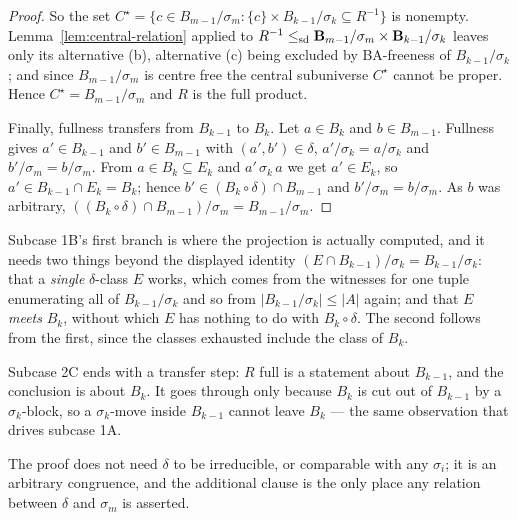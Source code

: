 \begin{proof}
So the set $C^{\star}=\{c\in B_{m-1}/\sigma_{m}:\{c\}\times B_{k-1}/\sigma_{k}
\subseteq R^{-1}\}$ is nonempty. Lemma~\ref{lem:central-relation} applied to
$R^{-1}\le_{\mathrm{sd}}\mathbf B_{m-1}/\sigma_{m}\times\mathbf B_{k-1}/\sigma_{k}$ leaves
only its alternative (b), alternative (c) being excluded by BA-freeness of
$B_{k-1}/\sigma_{k}$; and since $B_{m-1}/\sigma_{m}$ is centre free the central
subuniverse $C^{\star}$ cannot be proper. Hence
$C^{\star}=B_{m-1}/\sigma_{m}$ and $R$ is the full product.

Finally, fullness transfers from $B_{k-1}$ to $B_{k}$. Let $a\in B_{k}$ and
$b\in B_{m-1}$. Fullness gives $a'\in B_{k-1}$ and $b'\in B_{m-1}$ with
$(a',b')\in\delta$, $a'/\sigma_{k}=a/\sigma_{k}$ and
$b'/\sigma_{m}=b/\sigma_{m}$. From $a\in B_{k}\subseteq E_{k}$ and
$a'\,\sigma_{k}\,a$ we get $a'\in E_{k}$, so $a'\in B_{k-1}\cap E_{k}=B_{k}$;
hence $b'\in(B_{k}\circ\delta)\cap B_{m-1}$ and $b'/\sigma_{m}=b/\sigma_{m}$.
As $b$ was arbitrary, $((B_{k}\circ\delta)\cap B_{m-1})/\sigma_{m}=
B_{m-1}/\sigma_{m}$.
\end{proof}

\begin{hazard}\label{haz:self-intersection}
Subcase 1B's first branch is where the projection is actually computed, and it
needs two things beyond the displayed identity
$(E\cap B_{k-1})/\sigma_{k}=B_{k-1}/\sigma_{k}$: that a \emph{single}
$\delta$-class $E$ works, which comes from the witnesses for one tuple
enumerating all of $B_{k-1}/\sigma_{k}$ and so from $|B_{k-1}/\sigma_{k}|\le
|A|$ again; and that $E$ \emph{meets} $B_{k}$, without which $E$ has nothing to
do with $B_{k}\circ\delta$. The second follows from the first, since the
classes exhausted include the class of $B_{k}$.

Subcase 2C ends with a transfer step: $R$ full is a statement about
$B_{k-1}$, and the conclusion is about $B_{k}$. It goes through only because
$B_{k}$ is cut out of $B_{k-1}$ by a $\sigma_{k}$-block, so a $\sigma_{k}$-move
inside $B_{k-1}$ cannot leave $B_{k}$ --- the same observation that drives
subcase 1A.

The proof does not need $\delta$ to be irreducible, or comparable with any
$\sigma_{i}$; it is an arbitrary congruence, and the additional clause is the
only place any relation between $\delta$ and $\sigma_{m}$ is asserted.
\end{hazard}


